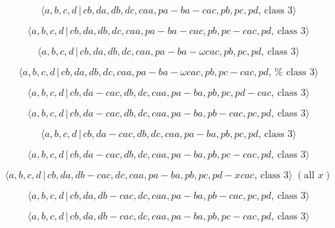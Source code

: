 \documentclass[10pt]{article}
\begin{document}
\begin{equation}
\langle a,b,c,d\,|\,cb,da,db,dc,caa,pa-ba-cac,pb,pc,pd,\,\text{class }%
3\rangle  \tag{7.3837}
\end{equation}

\begin{equation}
\langle a,b,c,d\,|\,cb,da,db,dc,caa,pa-ba-cac,pb,pc-cac,pd,\,\text{class }%
3\rangle  \tag{7.3838}
\end{equation}

\begin{equation}
\langle a,b,c,d\,|\,cb,da,db,dc,caa,pa-ba-\omega cac,pb,pc,pd,\,\text{class }%
3\rangle  \tag{7.3839}
\end{equation}

\begin{equation}
\langle a,b,c,d\,|\,cb,da,db,dc,caa,pa-ba-\omega cac,pb,pc-cac,pd,\,\text{%
class }3\rangle  \tag{7.3840}
\end{equation}

\begin{equation}
\langle a,b,c,d\,|\,cb,da-cac,db,dc,caa,pa-ba,pb,pc,pd-cac,\,\text{class }%
3\rangle  \tag{7.3841}
\end{equation}

\begin{equation}
\langle a,b,c,d\,|\,cb,da-cac,db,dc,caa,pa-ba,pb-cac,pc,pd,\,\text{class }%
3\rangle  \tag{7.3842}
\end{equation}

\begin{equation}
\langle a,b,c,d\,|\,cb,da-cac,db,dc,caa,pa-ba,pb,pc,pd,\,\text{class }%
3\rangle  \tag{7.3843}
\end{equation}

\begin{equation}
\langle a,b,c,d\,|\,cb,da-cac,db,dc,caa,pa-ba,pb,pc-cac,pd,\,\text{class }%
3\rangle  \tag{7.3844}
\end{equation}

\begin{equation}
\langle a,b,c,d\,|\,cb,da,db-cac,dc,caa,pa-ba,pb,pc,pd-xcac,\,\text{class }%
3\rangle \;(\text{all }x)  \tag{7.3845}
\end{equation}

\begin{equation}
\langle a,b,c,d\,|\,cb,da,db-cac,dc,caa,pa-ba,pb-cac,pc,pd,\,\text{class }%
3\rangle  \tag{7.3846}
\end{equation}

\begin{equation}
\langle a,b,c,d\,|\,cb,da,db-cac,dc,caa,pa-ba,pb,pc-cac,pd,\,\text{class }%
3\rangle  \tag{7.3847}
\end{equation}
\end{document}
